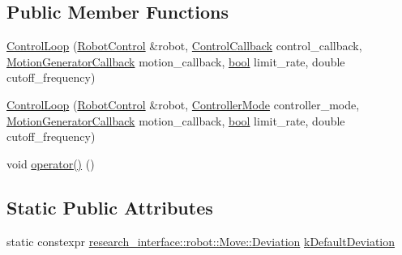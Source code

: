 \subsection*{Public Member Functions}
\begin{DoxyCompactItemize}
\item 
\hyperlink{classfranka_1_1ControlLoop_ac98d7227389027af16be738dbe7043c7}{Control\+Loop} (\hyperlink{classfranka_1_1RobotControl}{Robot\+Control} \&robot, \hyperlink{classfranka_1_1ControlLoop_a1b050245c6f2795d491899440f95cec3}{Control\+Callback} control\+\_\+callback, \hyperlink{classfranka_1_1ControlLoop_a23624d5a86fe2b206986af4757ba1822}{Motion\+Generator\+Callback} motion\+\_\+callback, \hyperlink{classbool}{bool} limit\+\_\+rate, double cutoff\+\_\+frequency)
\item 
\hyperlink{classfranka_1_1ControlLoop_a1fda76bf0db7818859abf1d52f6c0c94}{Control\+Loop} (\hyperlink{classfranka_1_1RobotControl}{Robot\+Control} \&robot, \hyperlink{namespacefranka_a3e20bc77587e2c0c53598753e3f4816b}{Controller\+Mode} controller\+\_\+mode, \hyperlink{classfranka_1_1ControlLoop_a23624d5a86fe2b206986af4757ba1822}{Motion\+Generator\+Callback} motion\+\_\+callback, \hyperlink{classbool}{bool} limit\+\_\+rate, double cutoff\+\_\+frequency)
\item 
void \hyperlink{classfranka_1_1ControlLoop_acfd08b5dca8a6618b2c4f8aa0ce751b7}{operator()} ()
\end{DoxyCompactItemize}
\subsection*{Static Public Attributes}
\begin{DoxyCompactItemize}
\item 
static constexpr \hyperlink{structresearch__interface_1_1robot_1_1Move_1_1Deviation}{research\+\_\+interface\+::robot\+::\+Move\+::\+Deviation} \hyperlink{classfranka_1_1ControlLoop_a935eeb4a950ed2276e5c00d26e9c5a16}{k\+Default\+Deviation}
\end{DoxyCompactItemize}
